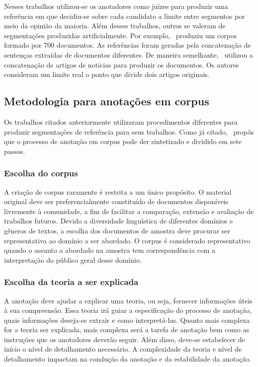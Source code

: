 Nesses trabalhos utilizou-se os anotadores como juízes para produzir uma referência em que decidiu-se sobre cada candidato a limite entre segmentos por meio da opinião da maioria. Além desses trabalhos, outros se valeram de segmentações produzidas artificialmente. Por exemplo,~\cite{Choi2000} produziu um corpos formado por 700 documentos. As referências foram geradas pela concatenação de sentenças extraídas de documentos diferentes. De maneira semelhante,~\cite{CHAIBI2014} utilizou a concatenação de artigos de noticias para produzir os documentos. Os autores consideram um limite real o ponto que divide dois artigos originais. 

\subsection{Metodologia para anotações em corpus}
\label{subsec:anotacoes}


Os trabalhos citados anteriormente utilizaram procedimentos diferentes para produzir segmentações de referência para seus trabalhos. Como já citado,~\cite{Hovy2010} propôs que o processo de anotação em corpus pode der sintetizado e dividido em sete passos. 


\subsubsection{Escolha do corpus}
A criação de corpus raramente é restrita a um único propósito. O material original deve ser preferencialmente constituído de documentos disponíveis livremente à comunidade, a fim de facilitar a comparação, extensão e avaliação de trabalhos futuros. 
Devido a diversidade linguística de diferentes domínios e gêneros de textos, a escolha dos documentos de amostra deve procurar ser representativa ao domínio a ser abordado. O corpus é considerado representativo quando o assunto a abordado na amostra tem correspondência com a interpretação do público geral desse domínio.

\subsubsection{Escolha da teoria a ser explicada}
A anotação deve ajudar a explicar uma teoria, ou seja, fornecer informações úteis à sua compreensão. Essa teoria irá guiar a especificação do processo de anotação, quais informações deseja-se extrair e como interpretá-las. Quanto mais complexa for a teoria ser explicada, mais complexa será a tarefa de anotação bem como as instruções que os anotadores deverão seguir. Além disso, deve-se estabelecer de início o nível de detalhamento necessário. 
A complexidade da teoria e nível de detalhamento impactam na condução da anotação e da estabilidade da anotação.

